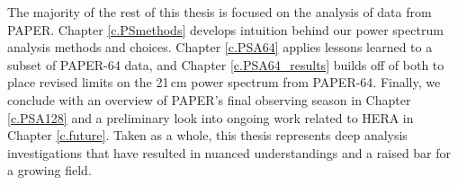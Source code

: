 The majority of the rest of this thesis is focused on the analysis of data from PAPER. Chapter \ref{c.PSmethods} develops intuition behind our power spectrum analysis methods and choices. Chapter \ref{c.PSA64} applies lessons learned to a subset of PAPER-64 data, and Chapter \ref{c.PSA64_results} builds off of both to place revised limits on the 21\,cm power spectrum from PAPER-64. Finally, we conclude with an overview of PAPER's final observing season in Chapter \ref{c.PSA128} and a preliminary look into ongoing work related to HERA in Chapter \ref{c.future}. Taken as a whole, this thesis represents deep analysis investigations that have resulted in nuanced understandings and a raised bar for a growing field. 


